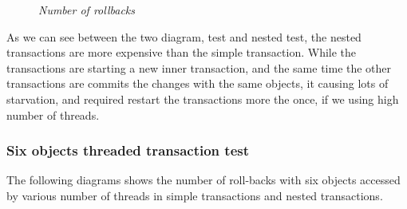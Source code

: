 \documentclass[12pt]{article}
\begin{document}
\begin{figure}[h!]%
    \centering
    \qquad
    \caption*{\textit{\color{gray}Number of rollbacks}}%
    \label{fig:example}%
\end{figure}

As we can see between the two diagram, test and nested test, the nested transactions are more expensive than the simple transaction. While the transactions are starting a new inner transaction, and the same time the other transactions are commits the changes with the same objects, it causing lots of starvation, and required restart the transactions more the once, if we using high number of threads. 
  

\newpage
\subsubsection{Six objects threaded transaction test}
The following diagrams shows the number of roll-backs with six objects accessed by various number of threads in simple transactions and nested transactions.
\end{document}
